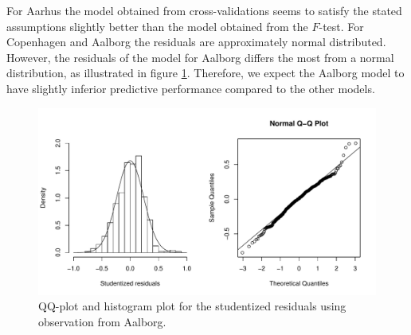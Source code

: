 For Aarhus the model obtained from cross-validations seems to satisfy the stated assumptions slightly better than the model obtained from the $F$-test. 
For Copenhagen and Aalborg the residuals are approximately normal distributed. 
However, the residuals of the model for Aalborg differs the most from a normal distribution, as illustrated in figure \ref{fig:studentized_res_plot_Aalborg}.
Therefore, we expect the Aalborg model to have slightly inferior predictive performance compared to the other models. 

    \begin{figure}[H]
        \centering
      \includegraphics[width = 0.95 \textwidth]{figures/Nanna/NormalAal.pdf}
      \caption{QQ-plot and histogram plot for the studentized residuals using observation from Aalborg.}
      \label{fig:studentized_res_plot_Aalborg}
    \end{figure}

    


